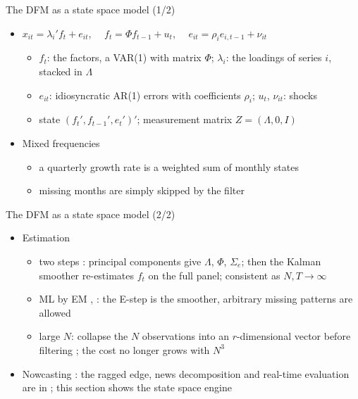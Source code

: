 \begin{frame}{The DFM as a state space model (1/2)}
\itemsize{\small}
\begin{itemize}
    \item $x_{it} = \lambda_i'f_t + e_{it}$, $\quad f_t = \Phi f_{t-1} + u_t$, $\quad e_{it} = \rho_ie_{i,t-1} + \nu_{it}$
    \begin{itemize}
        \item $f_t$: the factors, a VAR(1) with matrix $\Phi$; $\lambda_i$: the loadings of series $i$, stacked in $\Lambda$
        \item $e_{it}$: idiosyncratic AR(1) errors with coefficients $\rho_i$; $u_t$, $\nu_{it}$: shocks
        \item state $(f_t', f_{t-1}', e_t')'$; measurement matrix $Z = (\Lambda, 0, I)$
    \end{itemize}
    \item Mixed frequencies 
    \begin{itemize}
        \item a quarterly growth rate is a weighted sum of monthly states
        \item missing months are simply skipped by the filter
    \end{itemize}
\end{itemize}
\end{frame}

\begin{frame}{The DFM as a state space model (2/2)}
\itemsize{\small}
\begin{itemize}
    \item Estimation
    \begin{itemize}
        \item two steps : principal components give $\Lambda$, $\Phi$, $\Sigma_e$; then the Kalman smoother re-estimates $f_t$ on the full panel; consistent as $N, T \to \infty$
        \item ML by EM , : the E-step is the smoother, arbitrary missing patterns are allowed
        \item large $N$: collapse the $N$ observations into an $r$-dimensional vector before filtering ; the cost no longer grows with $N^3$
    \end{itemize}
    \item Nowcasting : the ragged edge, news decomposition and real-time evaluation are in ; this section shows the state space engine
\end{itemize}
\end{frame}

